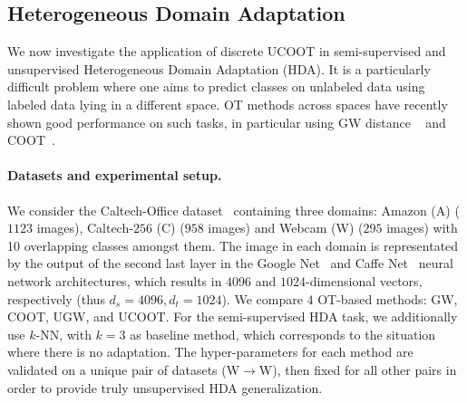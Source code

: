 \subsection{Heterogeneous Domain Adaptation}

We now investigate the application of discrete UCOOT in semi-supervised and unsupervised
Heterogeneous Domain Adaptation (HDA). It is a particularly difficult problem where
one aims to predict classes on unlabeled data using labeled data lying in a different space.
OT methods across spaces have recently shown good performance on such tasks,
in particular using GW distance ~\citep{Yan18} and COOT~\citep{Redko20}.

\paragraph{Datasets and experimental setup.} We consider the Caltech-Office dataset~\citep{Saenko10}
containing three domains:
Amazon (A) ($1123$ images), Caltech-$256$ (C) ($958$ images) and Webcam (W) ($295$ images)
with 10 overlapping classes amongst them. The image in each domain is representated by
the output of the second last layer
in the Google Net~\citep{Szegedy15} and Caffe Net~\citep{Jia14} neural network architectures,
which results in $4096$ and $1024$-dimensional vectors, respectively (thus $d_s = 4096, d_t = 1024$).
We compare $4$ OT-based methods: GW, COOT, UGW, and UCOOT. For the semi-supervised HDA task,
we additionally use $k$-NN, with $k=3$ as baseline method, which corresponds to the situation where
there is no adaptation. The hyper-parameters for each method are validated on a
unique pair of datasets (W$\rightarrow$W),
then fixed for all other pairs in order to provide truly unsupervised HDA generalization.

